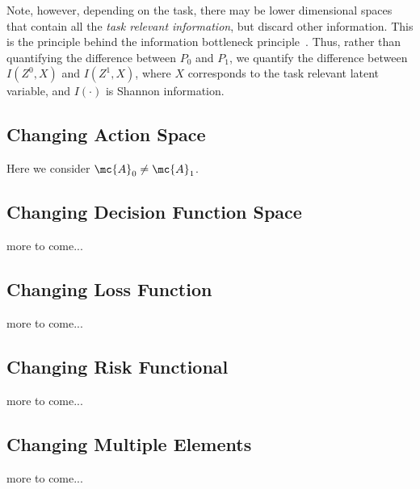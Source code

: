 \documentclass{article}
\begin{document}
Note, however, depending on the task, there may be lower dimensional spaces that contain all the \emph{task relevant information}, but discard other information.  This is the principle behind the information bottleneck principle~\cite{ibp}.  Thus, rather than quantifying the difference between $P_0$ and $P_1$, we quantify the difference between $I(Z^0,X)$ and $I(Z^1,X)$, where $X$ corresponds to the task relevant latent variable, and $I(\cdot)$ is Shannon information. 



\subsection{Changing Action Space}

Here we consider $\mc{A}_0 \neq \mc{A}_1$.  

\subsection{Changing Decision Function Space}

more to come...

\subsection{Changing Loss Function}

more to come...

\subsection{Changing Risk Functional}

more to come...

\subsection{Changing Multiple Elements}

more to come...
\end{document}
